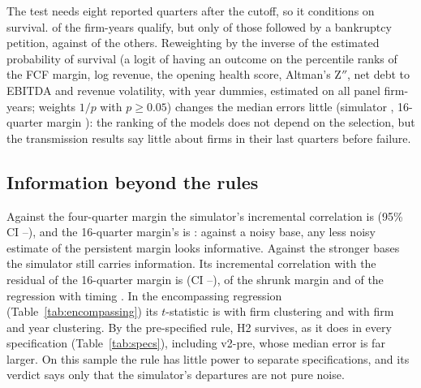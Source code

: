 \documentclass[preprint,12pt,authoryear]{elsarticle}
\begin{document}
The test needs eight reported quarters after the cutoff, so it conditions on survival. \AttrShare{} of the firm-years qualify, but only \AttrShareBk{} of those followed by a bankruptcy petition, against \AttrShareNonBk{} of the others. Reweighting by the inverse of the estimated probability of survival (a logit of having an outcome on the percentile ranks of the FCF margin, log revenue, the opening health score, Altman's Z$''$, net debt to EBITDA and revenue volatility, with year dummies, estimated on all panel firm-years; weights $1/p$ with $p\geq0.05$) changes the median errors little (simulator \AttrTwinIpw, 16-quarter margin \AttrSixteenIpw): the ranking of the models does not depend on the selection, but the transmission results say little about firms in their last quarters before failure.

\subsection{Information beyond the rules}
Against the four-quarter margin the simulator's incremental correlation is \TrIncrTwin{} (95\% CI \TrIncrTwinLo--\TrIncrTwinHi), and the 16-quarter margin's is \TrIncrSixteen: against a noisy base, any less noisy estimate of the persistent margin looks informative. Against the stronger bases the simulator still carries information. Its incremental correlation with the residual of the 16-quarter margin is \TrTwinVsSixteen{} (CI \TrTwinVsSixteenLo--\TrTwinVsSixteenHi), of the shrunk margin \TrTwinVsShrunk{} and of the regression with timing \TrTwinVsReg. In the encompassing regression (Table~\ref{tab:encompassing}) its $t$-statistic is \TrEncTwinT{} with firm clustering and \TrEncTwinTTwoWay{} with firm and year clustering. By the pre-specified rule, H2 survives, as it does in every specification (Table~\ref{tab:specs}), including v2-pre, whose median error is far larger. On this sample the rule has little power to separate specifications, and its verdict says only that the simulator's departures are not pure noise.
\end{document}
